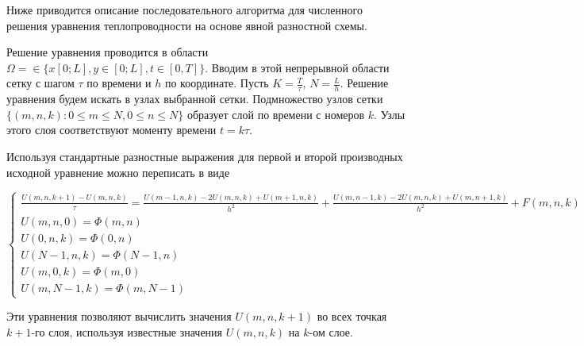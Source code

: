 \documentclass[11pt, oneside, a4paper]{article}
\begin{document}
Ниже приводится описание последовательного алгоритма для численного решения уравнения теплопроводности на основе явной разностной схемы.

Решение уравнения проводится в области $\Omega = \in \{x [0; L], y \in [0; L], t \in [0, T]\}$. Вводим в этой непрерывной области сетку с шагом $\tau$ по времени и $h$ по координате. Пусть $K = \frac{T}{\tau}$, $N = \frac{L}{h}$. Решение уравнения будем искать в узлах выбранной сетки. Подмножество узлов сетки $\{(m, n, k) : 0 \le m \le N, 0 \le n \le N\}$ образует слой по времени с номеров $k$. Узлы этого слоя соответствуют моменту времени $t = k \tau$.

Используя стандартные разностные выражения для первой и второй производных исходной уравнение можно переписать в виде

\begin{displaymath}
\left\{\begin{array}{l}
\frac{U(m, n, k+1) - U(m, n, k)}{\tau} = \frac{U(m-1, n, k) - 2U(m, n, k) + U(m+1, n, k)}{h^2} + \frac{U(m, n-1, k) - 2U(m, n, k) + U(m, n+1, k)}{h^2} + F(m, n, k) \\
U(m, n, 0) = \Phi (m, n) \\
U(0, n, k) = \Phi (0, n) \\
U(N-1, n, k) = \Phi (N-1, n) \\
U(m, 0, k) = \Phi(m, 0) \\
U(m, N-1, k) = \Phi(m, N-1)
\end{array}\right.
\end{displaymath}

Эти уравнения позволяют вычислить значения $U(m, n, k+1)$ во всех точкая $k+1$-го слоя, используя известные значения $U(m, n, k)$ на $k$-ом слое.
\end{document}

